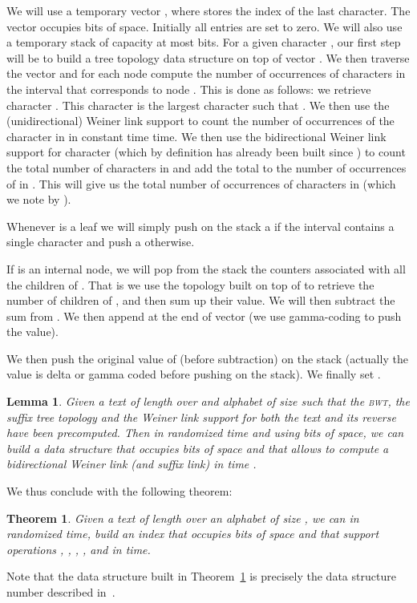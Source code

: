 \documentclass[a4paper]{article}
\newtheorem{lemma}{Lemma}
\newtheorem{theorem}{Theorem}
\begin{document}
\begin{enumerate}
We will use a temporary vector , 
where  stores the index of the last character. 
The vector occupies  bits of space. 
Initially all entries are set to zero. 
We will also use a temporary stack of capacity at most  bits. 
For a given character , our first step will be to build a tree topology 
data structure on top of vector . 
We then traverse the vector  and 
for each node  compute the number of occurrences of characters  
in the interval  that corresponds to node . This is done as follows:
we retrieve character . This character 
is the largest character  such that . We then 
use the (unidirectional) Weiner link support to count the number of occurrences of the 
character  in  in constant time time. 
We then use the bidirectional Weiner link support for character  (which by definition 
has already been built since ) to count the total number 
of characters  in  and add the total to the number of occurrences of 
 in . This will give us the total number of occurrences of characters 
 in  (which we note by ).

Whenever  is a leaf we will simply push on the stack 
a  if the interval  contains a single 
character  and push a  otherwise. 

If  is an internal node, we will pop from the stack the counters 
associated with all the children of . That is we use the topology
built on top of  to retrieve the number of children of , 
and then sum up their value. We will then subtract the sum from 
. We then append  at the end of vector 
 (we use gamma-coding to push the value).

We then push the original value of  (before subtraction) 
on the stack (actually the value is delta or gamma coded before 
pushing on the stack). We finally set . 

\begin{lemma}
\label{lemma:bi_weiner_link_support}
Given a text of length  over and alphabet of size  
such that the \textsc{bwt}, the suffix tree topology and 
the Weiner link support for both the text and its reverse 
have been precomputed. Then in  randomized time 
and using  bits of space, we can build a data structure 
that occupies  bits of space and that allows to compute a 
bidirectional Weiner link (and suffix link) in time .
\end{lemma}
We thus conclude with the following theorem:
\begin{theorem}
\label{theo:full_double_BWT}
Given a text of length  over an alphabet of size , 
we can in randomized  time, build an index that occupies 
 bits of space and that support operations , 
, , , 
 and  in  time. 
\end{theorem}
Note that the data structure built in Theorem~\ref{theo:full_double_BWT} 
is precisely the data structure number  described in~\cite{BCKM13}. 


\end{enumerate}
\end{document}
